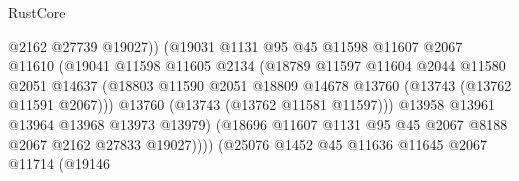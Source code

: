 \begin{lexlean}{RustCore}
\begin{coremodule}
                                        @2162
                                        @27739
                                        @19027))
                                    (@19031
                                      @1131
                                      @95
                                      @45
                                      @11598
                                      @11607
                                      @2067
                                      @11610
                                      (@19041
                                        @11598
                                        @11605
                                        @2134
                                        (@18789
                                          @11597
                                          @11604
                                          @2044
                                          @11580
                                          @2051
                                          @14637
                                          (@18803
                                            @11590
                                            @2051
                                            @18809
                                            @14678
                                            @13760
                                            (@13743 (@13762 @11591 @2067)))
                                          @13760
                                          (@13743 (@13762 @11581 @11597)))
                                        @13958
                                        @13961
                                        @13964
                                        @13968
                                        @13973
                                        @13979)
                                      (@18696
                                        @11607
                                        @1131
                                        @95
                                        @45
                                        @2067
                                        @8188
                                        @2067
                                        @2162
                                        @27833
                                        @19027))))
                                (@25076
                                  @1452
                                  @45
                                  @11636
                                  @11645
                                  @2067
                                  @11714
                                  (@19146

\end{coremodule}
\end{lexlean}
